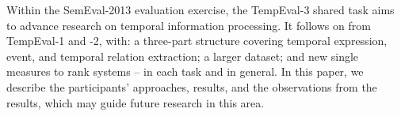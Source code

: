 Within the SemEval-2013 evaluation exercise, the TempEval-3 shared task aims to advance research on temporal information processing. It follows on from
 TempEval-1 and -2, with: a three-part structure covering  temporal expression,
 event, and temporal relation extraction; a larger dataset; and new single
 measures to rank systems -- in each task and in general. In this paper, we
 describe the participants' approaches, results, and the observations from the
 results, which may guide future research in this area.

